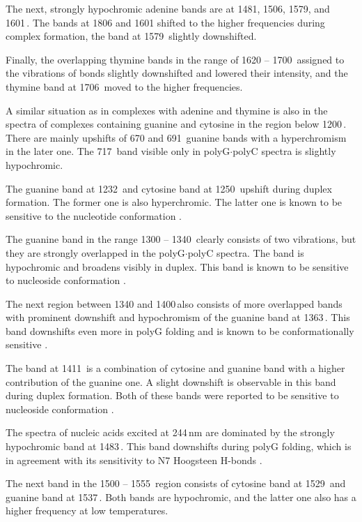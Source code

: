 The next, strongly hypochromic adenine bands are at 1481, 1506, 1579, and
1601\,\icm{}. The bands at 1806 and 1601 shifted to the higher frequencies
during complex formation, the band at 1579\,\icm{} slightly downshifted.

Finally, the overlapping thymine bands in the range of 1620 -- 1700\,\icm{}
assigned to the vibrations of  bonds slightly downshifted and lowered
their intensity, and the thymine band at 1706\,\icm{} moved to the higher
frequencies.

A similar situation as in complexes with adenine and thymine is also in the
spectra of complexes containing guanine and cytosine in the region below
1200\,\icm{}.
There are mainly upshifts of 670 and 691\,\icm{} guanine bands with a
hyperchromism in the later one.
The 717\,\icm{} band visible only in polyG$\cdot$polyC spectra is slightly
hypochromic.

The guanine band at 1232\,\icm{} and cytosine band at 1250\,\icm{} upshift
during duplex formation. The former one is also hyperchromic.
The latter one is known to be sensitive to the nucleotide conformation
\parencite{%
	Benevides2005,%
	Hernandez2005%
}.

The guanine band in the range 1300 -- 1340\,\icm{} clearly consists of two
vibrations, but they are strongly overlapped in the polyG$\cdot$polyC spectra.
The band is hypochromic and broadens visibly in duplex. This band is known to
be sensitive to nucleoside conformation
\parencite{Benevides2005}.

The next region between 1340 and 1400\,\icm also consists of more overlapped
bands with prominent downshift and hypochromism of the guanine band at
1363\,\icm{}.
This band downshifts even more in polyG folding and is known to be
conformationally sensitive
\parencite{Nishimura1986b}.

The band at 1411\,\icm{} is a combination of cytosine and guanine band with
a higher contribution of the guanine one.
A slight downshift is observable in this band during duplex formation.
Both of these bands were reported to be sensitive to nucleoside conformation
\parencite{Nishimura1986b}.

The spectra of nucleic acids excited at 244\,nm are dominated by the strongly
hypochromic band at 1483\,\icm{}.
This band downshifts during polyG folding, which is in agreement with its
sensitivity to N7 Hoogsteen H-bonds
\parencite{Palacky2013}.

The next band in the 1500 -- 1555\,\icm{} region consists of cytosine band at
1529\,\icm{} and guanine band at 1537\,\icm{}. Both bands are hypochromic, and
the latter one also has a higher frequency at low temperatures.


